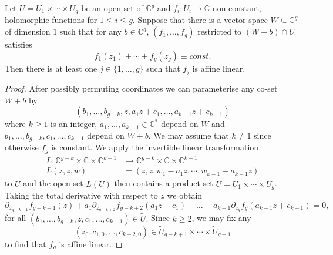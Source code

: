 \documentclass[10pt,a4paper]{amsart}
\newcommand{\C}{\mathbb{C}}
\begin{document}
\begin{lem}\label{lemfunctions} 
    Let $ U = U_1\times \cdots \times U_g$ be an open set of $\mathbb{C}^g$ and $f_i: U_i \rightarrow \mathbb{C}$ non-constant, holomorphic functions for $1 \leq i \leq g$. Suppose that there is a vector space $W \subseteq \mathbb{C}^g$ of dimension $1$ such that for any $b \in \C^g$, $(f_1, \dots, f_g)$ restricted to $(W + b) \cap U$ satisfies 
$$f_1(z_1) + \cdots + f_{g}(z_g) \equiv const.$$
Then there is at least one $j \in\{1, \dots, g\}$ such that $f_j$ is affine linear. 
\end{lem}

\begin{proof}
    After possibly permuting coordinates we can parameterise any co-set 
    $W + b$ by 
    $$(b_1, \dots, b_{g-k}, z,a_1 z + c_1,  \dots, a_{k-1}z + c_{k-1})$$ 
    where $k \geq 1$ is an integer, $a_1, \dots, a_{k-1} \in \C^*$ depend on $W$ and $b_1, \dots, b_{g-k}, c_1, \dots, c_{k-1}$ depend on $W + b$.  We may assume that $k \neq 1 $ since otherwise $f_g$ is constant. 
    We apply the invertible linear transformation 
\begin{align*}
L: \C^{g-k}\times \C\times \C^{k -1} & \rightarrow \C^{g-k}\times \C\times \C^{k -1} \\ 
    L(\underline{z},z, \underline{w}) & = (\underline{z},z, w_1 - a_1z, \cdots, w_{k-1}- a_{k-1}z)
\end{align*} 
to $U$ and the open set $L(U)$ then contains a product set $\tilde{U} = \tilde{U}_1\times \cdots \times \tilde{U}_g$. Taking the total derivative with respect to $z$ we obtain 
$$ \partial_{z_{g-k + 1}}f_{g-k + 1}(z) + a_1 \partial_{z_{g-k + 2}}f_{g-k + 2}(a_1z + c_1) + \dots + a_{k-1}\partial_{z_{g}}f_g(a_{k-1}z + c_{k-1}) =0,$$ 
for all $(b_1, \dots, b_{g-k},z, c_1, \dots,  c_{k-1}) \in \tilde{U}. $
Since $k \geq 2$, we may fix any 
\[(z_0, c_{1,0}, \dots, c_{k-2,0}) \in \tilde{U}_{g-k + 1}\times \cdots \times \tilde{U}_{g -1} \]
to find that $f_g$  is affine linear.  
\end{proof}
\end{document}
